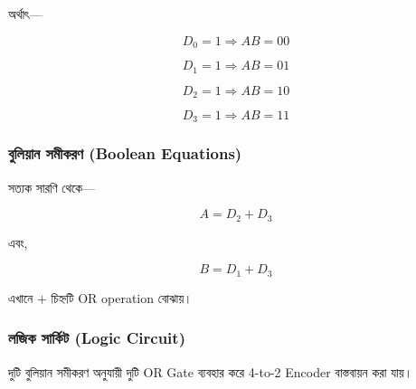 অর্থাৎ—

\[
D_0=1\Rightarrow AB=00
\]

\[
D_1=1\Rightarrow AB=01
\]

\[
D_2=1\Rightarrow AB=10
\]

\[
D_3=1\Rightarrow AB=11
\]



\subsubsection*{বুলিয়ান সমীকরণ
(\textenglish{Boolean Equations})}

সত্যক সারণি থেকে—

\[
\boxed{A=D_2+D_3}
\]

এবং,

\[
\boxed{B=D_1+D_3}
\]

এখানে \(+\) চিহ্নটি
\textenglish{OR operation} বোঝায়।



\subsubsection*{লজিক সার্কিট
(\textenglish{Logic Circuit})}

দুটি বুলিয়ান সমীকরণ অনুযায়ী
দুটি \textenglish{OR Gate} ব্যবহার করে
\textenglish{4-to-2 Encoder} বাস্তবায়ন করা যায়।


